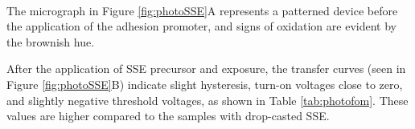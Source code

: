 \\

The micrograph in Figure \ref{fig:photoSSE}A represents a patterned device before the application of the adhesion promoter, and signs of oxidation are evident by the brownish hue. 

After the application of SSE precursor and exposure, the transfer curves (seen in Figure \ref{fig:photoSSE}B) indicate slight hysteresis, turn-on voltages close to zero, and slightly negative threshold voltages, as shown in Table \ref{tab:photofom}. These values are higher compared to the samples with drop-casted SSE. 

\begin{figure}[ht]
    \centering
    \hspace{2em}
    \qquad

\end{figure}
